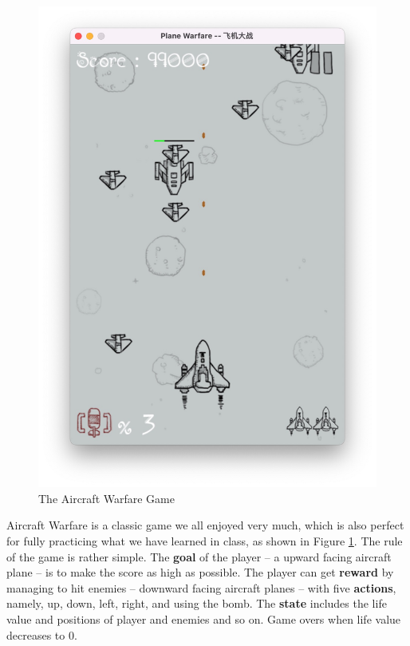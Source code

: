 \documentclass{article}
\begin{document}
\begin{figure}
    \centering
    \includegraphics[width=\linewidth]{pictures/game.jpg}
    \caption{The Aircraft Warfare Game}
    \label{fig:aircraft_warfare_game}
\end{figure}

\par Aircraft Warfare is a classic game we all enjoyed very much, which is also perfect for fully practicing what we have learned in class, as shown in Figure \ref{fig:aircraft_warfare_game}. The rule of the game is rather simple. The \textbf{goal} of the player -- a upward facing aircraft plane -- is to make the score as high as possible. The player can get \textbf{reward} by managing to hit enemies -- downward facing aircraft planes -- with five \textbf{actions}, namely, up, down, left, right, and using the bomb.  The \textbf{state} includes the life value and positions of player and enemies and so on. Game overs when life value decreases to 0.
\end{document}

